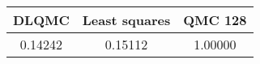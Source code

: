\begin{tabular}{|c|c|c|}
\hline
DLQMC&Least squares&QMC 128\\ 
\hline

0.14242 & 0.15112 & 1.00000\\ 
\hline
\end{tabular}

